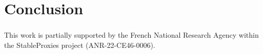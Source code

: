 \documentclass[runningheads]{llncs}
\begin{document}
\section{Conclusion}


\begin{credits}
  \subsubsection{\ackname}
  This work is partially supported by the French National Research Agency
  within the StableProxies project (ANR-22-CE46-0006).
\end{credits}
%
%
%


\end{document}
